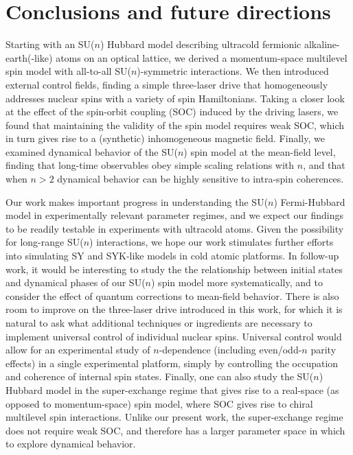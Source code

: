 \documentclass[aps,pra,nofootinbib,twocolumn,superscriptaddress]{revtex4-2}
\newcommand{\1}{\mathds{1}}
\begin{document}
\section{Conclusions and future directions}
\label{sec:conclusions}

Starting with an SU($n$) Hubbard model describing ultracold fermionic alkaline-earth(-like) atoms on an optical lattice, we derived a momentum-space multilevel spin model with all-to-all SU($n$)-symmetric interactions.
We then introduced external control fields, finding a simple three-laser drive that homogeneously addresses nuclear spins with a variety of spin Hamiltonians.
Taking a closer look at the effect of the spin-orbit coupling (SOC) induced by the driving lasers, we found that maintaining the validity of the spin model requires weak SOC, which in turn gives rise to a (synthetic) inhomogeneous magnetic field.
Finally, we examined dynamical behavior of the SU($n$) spin model at the mean-field level, finding that long-time observables obey simple scaling relations with $n$, and that when $n>2$ dynamical behavior can be highly sensitive to intra-spin coherences.

Our work makes important progress in understanding the SU($n$) Fermi-Hubbard model in experimentally relevant parameter regimes, and we expect our findings to be readily testable in experiments with ultracold atoms.
Given the possibility for long-range SU($n$) interactions, we hope our work stimulates further efforts into simulating SY and SYK-like models \cite{sachdev1993gapless, bentsen2019integrable} in cold atomic platforms.
In follow-up work, it would be interesting to study the the relationship between initial states and dynamical phases of our SU($n$) spin model more systematically, and to consider the effect of quantum corrections to mean-field behavior.
There is also room to improve on the three-laser drive introduced in this work, for which it is natural to ask what additional techniques or ingredients are necessary to implement universal control of individual nuclear spins.
Universal control would allow for an experimental study of $n$-dependence (including even/odd-$n$ parity effects) in a single experimental platform, simply by controlling the occupation and coherence of internal spin states.
Finally, one can also study the SU($n$) Hubbard model in the super-exchange regime that gives rise to a real-space (as opposed to momentum-space) spin model, where SOC gives rise to chiral multilevel spin interactions.
Unlike our present work, the super-exchange regime does not require weak SOC, and therefore has a larger parameter space in which to explore dynamical behavior.
\end{document}
